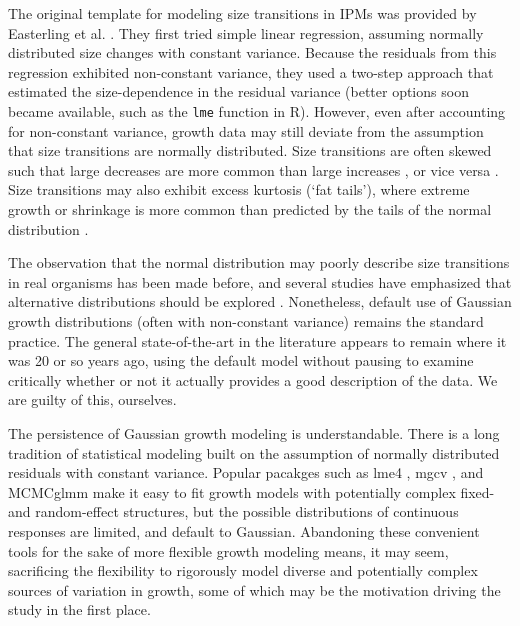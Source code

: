 \documentclass[12pt]{article}
\begin{document}
The original template for modeling size transitions in IPMs was provided by Easterling et al. \citeyear{easterling2000size}. 
They first tried simple linear regression, assuming normally distributed size changes with constant variance. 
Because the residuals from this regression exhibited non-constant variance, they used a two-step approach that estimated the size-dependence in the residual variance (better options soon became available, such as the \texttt{lme} function in R). 
However, even after accounting for non-constant variance, growth data may still deviate from the assumption that size transitions are normally distributed.  
Size transitions are often skewed such that large decreases are more common than large increases \citep{peterson2019improving,salguero2010keeping}, or vice versa \citep{stubberud2019effects}.
Size transitions may also exhibit excess kurtosis (`fat tails'), where extreme growth or shrinkage is more common than predicted by the tails of the normal distribution \citep{herault2011functional}. 

The observation that the normal distribution may poorly describe size transitions in real organisms has been made before,  
and several studies have emphasized that alternative distributions should be explored \citep{easterling2000size,peterson2019improving,rees2014building,williams2012avoiding}. 
Nonetheless, default use of Gaussian growth distributions (often with non-constant variance) remains the standard practice. 
The general state-of-the-art in the literature appears to remain where it was 20 or so years ago, using the default model without pausing to examine critically whether or not it actually provides a good description of the data. 
We are guilty of this, ourselves. 

The persistence of Gaussian growth modeling is understandable. 
There is a long tradition of statistical modeling built on the assumption of normally distributed residuals with constant variance.
Popular pacakges such as lme4 \citep{bates2007lme4}, mgcv \citep{wood-2017}, and MCMCglmm \citep{hadfield2010mcmc} make it easy to fit growth models with potentially complex fixed- and random-effect structures, but the possible distributions of continuous responses are limited, and default to Gaussian.
Abandoning these convenient tools for the sake of more flexible growth modeling means, it may seem, sacrificing the flexibility to rigorously model diverse and potentially complex sources of variation in growth, some of which may be the motivation driving the study in the first place.
\end{document}
